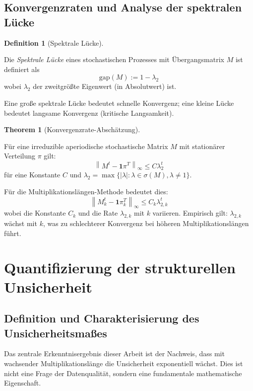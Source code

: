 \documentclass[a4paper,12pt]{article}
\theoremstyle{definition}
\newtheorem{definition}{Definition}
\newtheorem{theorem}{Theorem}
\begin{document}
\subsection{Konvergenzraten und Analyse der spektralen Lücke}

\begin{definition}[Spektrale Lücke]
\label{def:spektral_lucke}

Die \emph{Spektrale Lücke} eines stochastischen Prozesses mit Übergangsmatrix $M$ ist definiert als
\[
\text{gap}(M) := 1 - \lambda_2
\]
wobei $\lambda_2$ der zweitgrößte Eigenwert (in Absolutwert) ist.

Eine große spektrale Lücke bedeutet schnelle Konvergenz; eine kleine Lücke bedeutet langsame Konvergenz (kritische Langsamkeit).
\end{definition}

\begin{theorem}[Konvergenzrate-Abschätzung]
\label{thm:konvergenzrate}

Für eine irreduzible aperiodische stochastische Matrix $M$ mit stationärer Verteilung $\pi$ gilt:
\[
\left\| M^t - \mathbf{1} \pi^T \right\|_\infty \leq C \lambda_2^t
\]
für eine Konstante $C$ und $\lambda_2 = \max\{|\lambda| : \lambda \in \sigma(M), \lambda \neq 1\}$.

Für die Multiplikationslängen-Methode bedeutet dies:
\[
\left\| M_k^t - \mathbf{1} \pi^T_k \right\|_\infty \leq C_k \lambda_{2,k}^t
\]
wobei die Konstante $C_k$ und die Rate $\lambda_{2,k}$ mit $k$ variieren. Empirisch gilt: $\lambda_{2,k}$ wächst mit $k$, was zu schlechterer Konvergenz bei höheren Multiplikationslängen führt.
\end{theorem}

\section{Quantifizierung der strukturellen Unsicherheit}

\subsection{Definition und Charakterisierung des Unsicherheitsmaßes}

Das zentrale Erkenntnisergebnis dieser Arbeit ist der Nachweis, dass mit wachsender Multiplikationslänge die Unsicherheit exponentiell wächst. Dies ist nicht eine Frage der Datenqualität, sondern eine fundamentale mathematische Eigenschaft.
\end{document}
